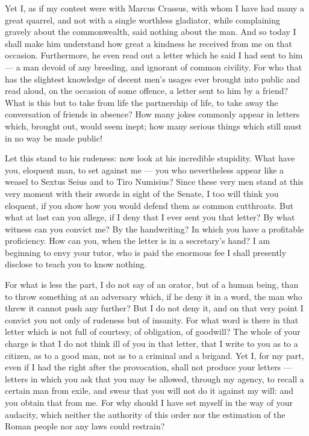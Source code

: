  Yet I, as if my contest were with Marcus Crassus, with whom I have had many a great quarrel, and not with a single worthless gladiator, while complaining gravely about the commonwealth, said nothing about the man. And so today I shall make him understand how great a kindness he received from me on that occasion. Furthermore, he even read out a letter which he said I had sent to him --- a man devoid of any breeding, and ignorant of common civility. For who that has the slightest knowledge of decent men's usages ever brought into public and read aloud, on the occasion of some offence, a letter sent to him by a friend? What is this but to take from life the partnership of life, to take away the conversation of friends in absence? How many jokes commonly appear in letters which, brought out, would seem inept; how many serious things which still must in no way be made public!

 Let this stand to his rudeness: now look at his incredible stupidity. What have you, eloquent man, to set against me --- you who nevertheless appear like a weasel to Sextus Seius and to Tiro Numisius? Since these very men stand at this very moment with their swords in sight of the Senate, I too will think you eloquent, if you show how you would defend them as common cutthroats. But what at last can you allege, if I deny that I ever sent you that letter? By what witness can you convict me? By the handwriting? In which you have a profitable proficiency. How can you, when the letter is in a secretary's hand? I am beginning to envy your tutor, who is paid the enormous fee I shall presently disclose to teach you to know nothing.

 For what is less the part, I do not say of an orator, but of a human being, than to throw something at an adversary which, if he deny it in a word, the man who threw it cannot push any further? But I do not deny it, and on that very point I convict you not only of rudeness but of insanity. For what word is there in that letter which is not full of courtesy, of obligation, of goodwill? The whole of your charge is that I do not think ill of you in that letter, that I write to you as to a citizen, as to a good man, not as to a criminal and a brigand. Yet I, for my part, even if I had the right after the provocation, shall not produce your letters --- letters in which you ask that you may be allowed, through my agency, to recall a certain man from exile, and swear that you will not do it against my will: and you obtain that from me. For why should I have set myself in the way of your audacity, which neither the authority of this order nor the estimation of the Roman people nor any laws could restrain?

